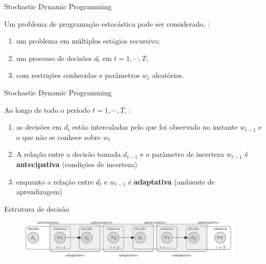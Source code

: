 \documentclass{beamer}
\begin{document}
\begin{frame}{Stochastic Dynamic Programming}

Um problema de programação estocástica pode ser considerado, \citep{Consigli1998}:

\begin{enumerate}
\item um problema em múltiplos estágios recursivo;
\item um processo de decisões $d_t$ em $t=1,\cdots,T$;
\item com restrições conhecidas e parâmetros $w_t$ aleatórios. 
\end{enumerate}

\end{frame}



\begin{frame}{Stochastic Dynamic Programming}

Ao longo de todo o período $t=1,\cdots,T$, \citep{Kouwenberg2008}:

\begin{enumerate}
\item as decisões em $d_t$ estão intercaladas pelo que foi observado no instante $w_{t-1}$ e o que não se conhece sobre $w_{t}$
\item A relação entre a decisão tomada $d_{t-1}$ e o parâmetro de incerteza $w_{t-1}$ é \textbf{antecipativa} (condições de incerteza)
\item enquanto a relação entre $d_t$ e $w_{t-1}$ é \textbf{adaptativa} (ambiente de aprendizagem)
\end{enumerate} 

\end{frame}


\begin{frame}{Estrutura de decisão}
\begin{figure}
\begin{center}
 \includegraphics[height=2cm,keepaspectratio]{processo_adapt_antecipa.png}
 \end{center}
\label{fig:dp}
\end{figure}

\end{frame}
\end{document}
